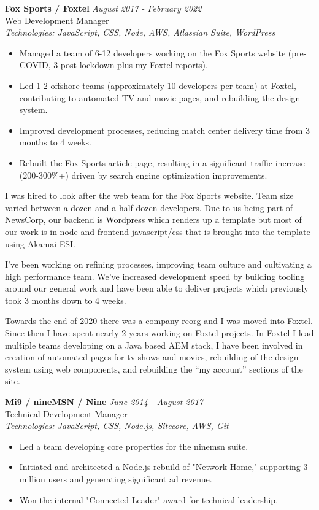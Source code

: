 \documentclass[a4paper,10pt]{article}
\begin{document}
\textbf{Fox Sports / Foxtel} \hfill \textit{August 2017 - February 2022} \\
Web Development Manager \\
\textit{Technologies: JavaScript, CSS, Node, AWS, Atlassian Suite, WordPress}
\begin{itemize}
    \item Managed a team of 6-12 developers working on the Fox Sports website (pre-COVID, 3 post-lockdown plus my Foxtel reports).
    \item Led 1-2 offshore teams (approximately 10 developers per team) at Foxtel, contributing to automated TV and movie pages, and rebuilding the design system.
    \item Improved development processes, reducing match center delivery time from 3 months to 4 weeks.
    \item Rebuilt the Fox Sports article page, resulting in a significant traffic increase (200-300\%+) driven by search engine optimization improvements.
\end{itemize}

I was hired to look after the web team for the Fox Sports website. Team size varied between a dozen and a half dozen developers. Due to us being part of NewsCorp, our backend is Wordpress which renders up a template but most of our work is in node and frontend javascript/css that is brought into the template using Akamai ESI.

I’ve been working on refining processes, improving team culture and cultivating a high performance team. We’ve increased development speed by building tooling around our general work and have been able to deliver projects which previously took 3 months down to 4 weeks.

Towards the end of 2020 there was a company reorg and I was moved into Foxtel. Since then I have spent nearly 2 years working on Foxtel projects. In Foxtel I lead multiple teams developing on a Java based AEM stack, I have been involved in creation of automated pages for tv shows and movies, rebuilding of the design system using web components, and rebuilding the “my account” sections of the site.

\vspace{1em}

\textbf{Mi9 / nineMSN / Nine} \hfill \textit{June 2014 - August 2017} \\
Technical Development Manager \\
\textit{Technologies: JavaScript, CSS, Node.js, Sitecore, AWS, Git}
\begin{itemize}
    \item Led a team developing core properties for the ninemsn suite.
    \item Initiated and architected a Node.js rebuild of "Network Home," supporting 3 million users and generating significant ad revenue.
    \item Won the internal "Connected Leader" award for technical leadership.
\end{itemize}
\end{document}
